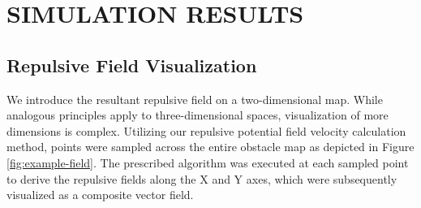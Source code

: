 \documentclass[letterpaper, 10 pt, conference]{ieeeconf}  %
\begin{document}
\section{SIMULATION RESULTS}

\subsection{Repulsive Field Visualization}

We introduce the resultant repulsive field on a two-dimensional map. While analogous principles apply to three-dimensional spaces, visualization of more dimensions is complex. Utilizing our repulsive potential field velocity calculation method, points were sampled across the entire obstacle map as depicted in Figure \ref{fig:example-field}. The prescribed algorithm was executed at each sampled point to derive the repulsive fields along the X and Y axes, which were subsequently visualized as a composite vector field.
\end{document}
